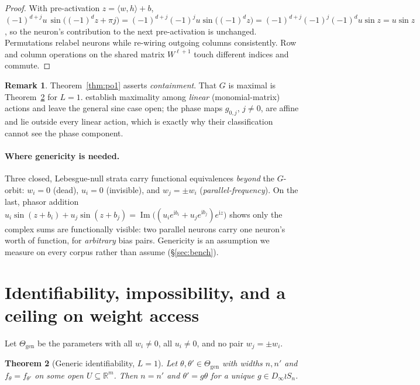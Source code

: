 \documentclass[10pt,letterpaper]{article}
\newtheorem{theorem}{Theorem}
\theoremstyle{definition}
\newtheorem{remark}[theorem]{Remark}
\newcommand{\R}{\mathbb{R}}
\newcommand{\Dinf}{D_\infty}
\newcommand{\Thgen}{\Theta_{\mathrm{gen}}}
\begin{document}
\begin{proof}
With pre-activation $z = \langle w,h\rangle + b$,
$(-1)^{d+j} u\,\sin\!\big((-1)^d z + \pi j\big)
 = (-1)^{d+j}(-1)^{j} u \sin\!\big((-1)^d z\big)
 = (-1)^{d+j}(-1)^{j}(-1)^{d} u \sin z = u \sin z$,
so the neuron's contribution to the next pre-activation is unchanged. Permutations relabel
neurons while re-wiring outgoing columns consistently. Row and column operations on the shared
matrix $W^{\ell+1}$ touch different indices and commute.
\end{proof}

\begin{remark}
Theorem~\ref{thm:po1} asserts \emph{containment}. That $G$ is maximal is
Theorem~\ref{thm:po2} for $L=1$. \citet{tran2024monomial} establish maximality among
\emph{linear} (monomial-matrix) actions and leave the general sine case open; the phase maps
$g_{0,j}$, $j\neq0$, are affine and lie outside every linear action, which is exactly why their
classification cannot see the phase component.
\end{remark}

\paragraph{Where genericity is needed.} Three closed, Lebesgue-null strata carry functional
equivalences \emph{beyond} the $G$-orbit: $w_i = 0$ (dead), $u_i = 0$ (invisible), and
$w_j = \pm w_i$ (\emph{parallel-frequency}). On the last, phasor addition
$u_i\sin(z+b_i) + u_j\sin(z+b_j) = \operatorname{Im}\big((u_ie^{\mathrm i b_i}
+ u_je^{\mathrm i b_j})e^{\mathrm i z}\big)$
shows only the complex sums are functionally visible: two parallel neurons carry one neuron's
worth of function, for \emph{arbitrary} bias pairs. Genericity is an assumption we measure on
every corpus rather than assume (\S\ref{sec:bench}).

\section{Identifiability, impossibility, and a ceiling on weight access}
\label{sec:identifiability}

Let $\Thgen$ be the parameters with all $w_i \neq 0$, all $u_i \neq 0$, and no pair
$w_j = \pm w_i$.

\begin{theorem}[Generic identifiability, $L=1$]\label{thm:po2}
Let $\theta,\theta' \in \Thgen$ with widths $n, n'$ and $f_\theta = f_{\theta'}$ on some open
$U \subseteq \R^m$. Then $n = n'$ and $\theta' = g\theta$ for a \emph{unique}
$g \in \Dinf \wr S_n$.
\end{theorem}
\end{document}
